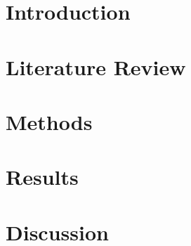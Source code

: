 \documentclass[APA,Times1COL]{WileyNJDv5}
\begin{document}






%



\section{Introduction}



\section{Literature Review}








\section{Methods}




\section{Results}



\section{Discussion}






\end{document}
